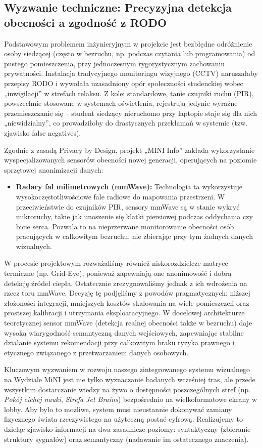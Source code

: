 \documentclass[14pt,a4paper]{extarticle}
\begin{document}
\subsection{Wyzwanie techniczne: Precyzyjna detekcja obecności a zgodność z RODO}
Podstawowym problemem inżynieryjnym w projekcie jest bezbłędne odróżnienie osoby siedzącej (często w bezruchu, np. podczas czytania lub programowania) od pustego pomieszczenia, przy jednoczesnym rygorystycznym zachowaniu prywatności. Instalacja tradycyjnego monitoringu wizyjnego (CCTV) naruszałaby przepisy RODO i wywołała uzasadniony opór społeczności studenckiej wobec „inwigilacji” w strefach relaksu. Z kolei standardowe, tanie czujniki ruchu (PIR), powszechnie stosowane w systemach oświetlenia, rejestrują jedynie wyraźne przemieszczanie się -- student siedzący nieruchomo przy laptopie staje się dla nich „niewidzialny”, co prowadziłoby do drastycznych przekłamań w systemie (tzw. zjawisko false negatives).

Zgodnie z zasadą Privacy by Design, projekt „MINI Info” zakłada wykorzystanie wyspecjalizowanych sensorów obecności nowej generacji, operujących na poziomie sprzętowej anonimizacji danych:
\begin{itemize}
    \item \textbf{Radary fal milimetrowych (mmWave):} Technologia ta wykorzystuje wysokoczęstotliwościowe fale radiowe do mapowania przestrzeni. W przeciwieństwie do czujników PIR, sensory mmWave są w stanie wykryć mikroruchy, takie jak unoszenie się klatki piersiowej podczas oddychania czy bicie serca. Pozwala to na nieprzerwane monitorowanie obecności osób pracujących w całkowitym bezruchu, nie zbierając przy tym żadnych danych wizualnych.
\end{itemize}
W procesie projektowym rozważaliśmy również niskorozdzielcze matryce termiczne (np. Grid-Eye), ponieważ zapewniają one anonimowość i dobrą detekcję źródeł ciepła. Ostatecznie zrezygnowaliśmy jednak z ich wdrożenia na rzecz toru mmWave. Decyzję tę podjęliśmy z powodów pragmatycznych: niższej złożoności integracji, mniejszych kosztów skalowania na wiele pomieszczeń oraz prostszej kalibracji i utrzymania eksploatacyjnego. W docelowej architekturze teoretycznej sensor mmWave (detekcja realnej obecności także w bezruchu) daje wysoką wiarygodność semantyczną danych wejściowych, zapewniając stabilne działanie systemu rekomendacji przy całkowitym braku ryzyka prawnego i etycznego związanego z przetwarzaniem danych osobowych.

Kluczowym wyzwaniem w rozwoju naszego zintegrowanego systemu wizualnego na Wydziale MiNI jest nie tylko wyznaczanie badanych wcześniej tras, ale przede wszystkim dostarczanie wiedzy na żywo o dostępności poszczególnych stref (np. \textit{Pokój cichej nauki}, \textit{Strefa Jet Brains}) bezpośrednio na wielkoformatowe ekrany w lobby. Aby było to możliwe, system musi nieustannie dokonywać zamiany fizycznego świata rzeczywistego na użyteczną postać cyfrową. Realizujemy to dzieląc zjawisko informacji na dwa zasadnicze poziomy: syntaktyczny (zbieranie struktury sygnałów) oraz semantyczny (nadawanie im ostatecznego znaczenia).
\end{document}
